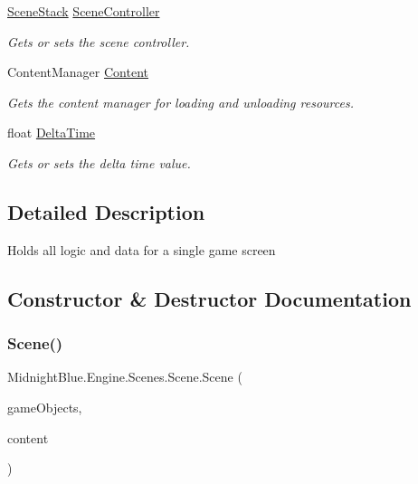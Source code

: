 \begin{DoxyCompactItemize}
\hyperlink{class_midnight_blue_1_1_engine_1_1_scenes_1_1_scene_stack}{Scene\+Stack} \hyperlink{class_midnight_blue_1_1_engine_1_1_scenes_1_1_scene_a1a8c2aa7f4d60a3a99043f31392ddecb}{Scene\+Controller}
\begin{DoxyCompactList}\small\item\em Gets or sets the scene controller. \end{DoxyCompactList}\item 
Content\+Manager \hyperlink{class_midnight_blue_1_1_engine_1_1_scenes_1_1_scene_ad331b8ccde470e0a1b13b50e53e5fa58}{Content}
\begin{DoxyCompactList}\small\item\em Gets the content manager for loading and unloading resources. \end{DoxyCompactList}\item 
float \hyperlink{class_midnight_blue_1_1_engine_1_1_scenes_1_1_scene_a51414d69565d89db676b16932f3822e9}{Delta\+Time}
\begin{DoxyCompactList}\small\item\em Gets or sets the delta time value. \end{DoxyCompactList}\end{DoxyCompactItemize}


\subsection{Detailed Description}
Holds all logic and data for a single game screen 



\subsection{Constructor \& Destructor Documentation}
\hypertarget{class_midnight_blue_1_1_engine_1_1_scenes_1_1_scene_ae99d5a05cb0441676e6a41cd502eb0a4}{}\label{class_midnight_blue_1_1_engine_1_1_scenes_1_1_scene_ae99d5a05cb0441676e6a41cd502eb0a4} 
\subsubsection{\texorpdfstring{Scene()}{Scene()}}
{\footnotesize\ttfamily Midnight\+Blue.\+Engine.\+Scenes.\+Scene.\+Scene (\begin{DoxyParamCaption}\item[{\hyperlink{class_midnight_blue_1_1_engine_1_1_entity_component_1_1_entity_map}{Entity\+Map}}]{game\+Objects,  }\item[{Content\+Manager}]{content }\end{DoxyParamCaption})\hspace{0.3cm}{\ttfamily [inline]}}



